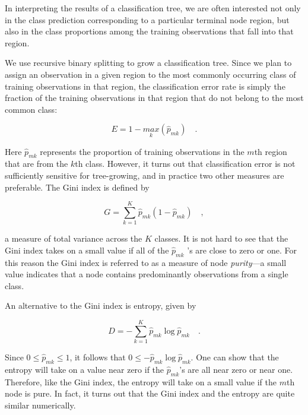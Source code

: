 \documentclass[a4paper, 12pt]{book}
\begin{document}
In interpreting the results of a classification tree, we are often interested not only in the class prediction
corresponding to a particular terminal node region, but also in the class proportions among the training
observations that fall into that region.

We use recursive binary splitting to grow a classification tree. Since we plan to assign an observation
in a given region to the most commonly occurring class of training observations in that region,
the classification error rate is simply the fraction of the training observations in that region that do not
belong to the most common class:

\begin{center}
\begin{equation}
 E = 1 - \underset{k}{max}(\widehat{p}_{mk}) \quad.
\end{equation}
\end{center}


Here $\widehat{p}_{mk}$ represents the proportion of training observations in the $m$th region that are from the $k$th class. 
However, it turns out that classification error is not sufficiently sensitive for tree-growing,
and in practice two other measures are preferable.
The Gini index is defined by

\begin{center}
\begin{equation}
G = \sum_{k=1}^{K} \widehat{p}_{mk}(1 -  \widehat{p}_{mk}) \quad ,
\end{equation}
\end{center}

a measure of total variance across the $K$ classes. It is not hard to see that the Gini index takes on
a small value if all of the $\widehat{p}_{mk}$ ’s are close to zero or one.  For this reason the Gini index
is referred to as a measure of node \emph{purity}—a small value indicates that a node contains predominantly
observations from a single class.

An alternative to the Gini index is entropy, given by

\begin{center}
\begin{equation}
D = - \sum_{k=1}^{K} \widehat{p}_{mk}\log \widehat{p}_{mk}   \quad .
\end{equation}
\end{center}

Since $0 \leq  \widehat{p}_{mk} \leq 1$, it follows that $0 \leq - \widehat{p}_{mk} \log  \widehat{p}_{mk}$.
One can show that the entropy will take on a value near zero if the $\widehat{p}_{mk}$’s are all near zero or
near one. Therefore, like the Gini index, the entropy will take on a small value if the $m$th node is pure.
In fact, it turns out that the Gini index and the entropy are quite similar numerically.
\end{document}
